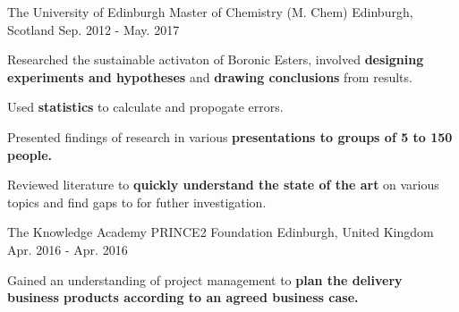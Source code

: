 \begin{cventries}
  \cventry
    {The University of Edinburgh} %
    {Master of Chemistry (M. Chem)} %
    {Edinburgh, Scotland} %
    {Sep. 2012 - May. 2017} %
    {
      \begin{cvitems} %
        \item {Researched the sustainable activaton of Boronic Esters, involved \textbf{designing experiments and hypotheses} and \textbf{drawing conclusions} from results.}
        \item {Used \textbf{statistics} to calculate and propogate errors.}
        \item {Presented findings of research in various \textbf{presentations to groups of 5 to 150 people.}}
        \item {Reviewed literature to \textbf{quickly understand the state of the art} on various topics and find gaps to for futher investigation.}
      \end{cvitems}
    }

    \cventry
    {The Knowledge Academy} %
    {PRINCE2 Foundation} %
    {Edinburgh, United Kingdom} %
    {Apr. 2016 - Apr. 2016} %
    {
      \begin{cvitems} %
        \item {Gained an understanding of project management to \textbf{plan the delivery business products according to an agreed business case.}}
      \end{cvitems}
    }

\end{cventries}

\begin{comment}
  \cventry
    {Bonn International School} %
    {International Baccalaureate (IB)} %
    {Bonn, Germany} %
    {Sep. 2010 - May. 2012} %
    {
      \begin{cvitems} %
        \item {Took part in "Theory of Knowledge", learned to think critically.}
        \item {Learned time managment skills used for studying a broad change of subjects.
        \item {Conducted individual research experiment in Chemistry which resulted in an "extended essay".}
        \item {Immersed in a diverse culture.}
      \end{cvitems}
    }
\end{comment}

